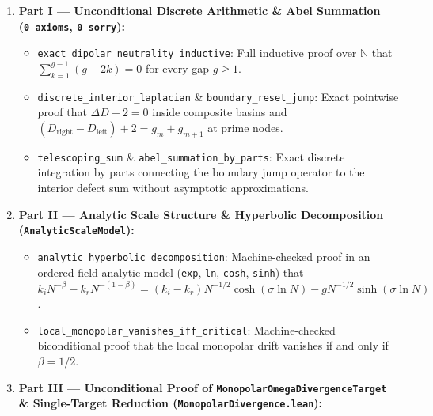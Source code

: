\documentclass[
  11pt,
]{article}
\providecommand{\tightlist}{%
  \setlength{\itemsep}{0pt}\setlength{\parskip}{0pt}}
\begin{document}
\begin{enumerate}
\def\labelenumi{\arabic{enumi}.}
\tightlist
\item
  \textbf{Part I --- Unconditional Discrete Arithmetic \& Abel Summation
  (\texttt{0\ axioms}, \texttt{0\ sorry}):}

  \begin{itemize}
  \tightlist
  \item
    \texttt{exact\_dipolar\_neutrality\_inductive}: Full inductive proof
    over \(\mathbb{N}\) that \(\sum_{k=1}^{g-1} (g - 2k) = 0\) for every
    gap \(g \ge 1\).
  \item
    \texttt{discrete\_interior\_laplacian} \&
    \texttt{boundary\_reset\_jump}: Exact pointwise proof that
    \(\Delta D + 2 = 0\) inside composite basins and
    \((D_{\text{right}} - D_{\text{left}}) + 2 = g_m + g_{m+1}\) at
    prime nodes.
  \item
    \texttt{telescoping\_sum} \& \texttt{abel\_summation\_by\_parts}:
    Exact discrete integration by parts connecting the boundary jump
    operator to the interior defect sum without asymptotic
    approximations.
  \end{itemize}
\item
  \textbf{Part II --- Analytic Scale Structure \& Hyperbolic
  Decomposition (\texttt{AnalyticScaleModel}):}

  \begin{itemize}
  \tightlist
  \item
    \texttt{analytic\_hyperbolic\_decomposition}: Machine-checked proof
    in an ordered-field analytic model (\texttt{exp}, \texttt{ln},
    \texttt{cosh}, \texttt{sinh}) that
    \(k_i N^{-\beta} - k_r N^{-(1-\beta)} = (k_i - k_r) N^{-1/2}\cosh(\sigma \ln N) - g N^{-1/2}\sinh(\sigma \ln N)\).
  \item
    \texttt{local\_monopolar\_vanishes\_iff\_critical}: Machine-checked
    biconditional proof that the local monopolar drift vanishes if and
    only if \(\beta = 1/2\).
  \end{itemize}
\item
  \textbf{Part III --- Unconditional Proof of
  \texttt{MonopolarOmegaDivergenceTarget} \& Single-Target Reduction
  (\texttt{MonopolarDivergence.lean}):}


\end{enumerate}
\end{document}
